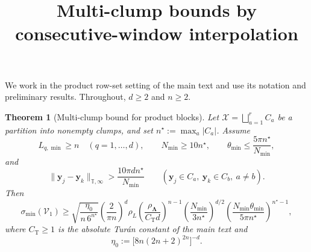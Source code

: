 \documentclass[11pt]{article}
\title{Multi-clump bounds by consecutive-window interpolation}
\author{}
\date{}
\newtheorem{theorem}{Theorem}
\newcommand{\V}{\mathcal V}
\newcommand{\X}{\mathcal X}
\newcommand{\T}{\mathbb T}
\begin{document}
\maketitle

We work in the product row-set setting of the main text and use its notation and preliminary results. Throughout, $d\ge2$ and $n\ge2$.

\begin{theorem}[Multi-clump bound for product blocks]\label{thm:main}
Let $\X=\bigsqcup_{a=1}^r C_a$ be a partition into nonempty clumps, and set $n^\star:=\max_a|C_a|$. Assume
\begin{equation}\label{eq:main-hyp}
L_{q,\min}\ge n\quad(q=1,\ldots,d),\qquad N_{\min}\ge10n^\star,\qquad \theta_{\min}\le\frac{5\pi n^\star}{N_{\min}},
\end{equation}
and
\begin{equation}\label{eq:clump-gap}
\|\bm y_j-\bm y_k\|_{\T,\infty}>\frac{10\pi dn^\star}{N_{\min}}\qquad(\bm y_j\in C_a,\ \bm y_k\in C_b,\ a\ne b).
\end{equation}
Then
\begin{equation}\label{eq:main}
\sigma_{\min}(\V_1)\ge\sqrt{\frac{\eta_0}{n\,6^{n^\star}}}\left(\frac{2}{\pi n}\right)^d\rho_L\left(\frac{\rho_{\bm\Lambda}}{C_{\mathrm T}d}\right)^{n-1}\left(\frac{N_{\min}}{3n^\star}\right)^{d/2}\left(\frac{N_{\min}\theta_{\min}}{5\pi n^\star}\right)^{n^\star-1},
\end{equation}
where $C_{\mathrm T}\ge1$ is the absolute Tur\'an constant of the main text and
\begin{equation}\label{eq:eta-choice}
\eta_0:=\bigl[8n(2n+2)^{2n}\bigr]^{-d}.
\end{equation}
\end{theorem}
\end{document}
